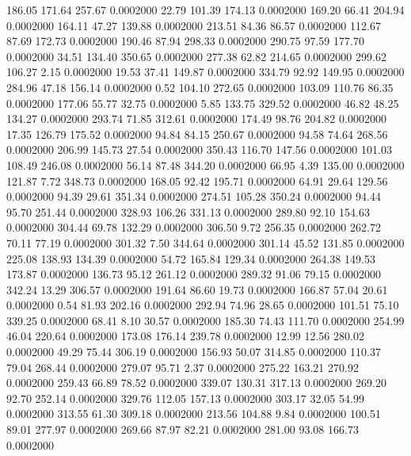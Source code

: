  186.05  171.64  257.67   0.0002000
  22.79  101.39  174.13   0.0002000
 169.20   66.41  204.94   0.0002000
 164.11   47.27  139.88   0.0002000
 213.51   84.36   86.57   0.0002000
 112.67   87.69  172.73   0.0002000
 190.46   87.94  298.33   0.0002000
 290.75   97.59  177.70   0.0002000
  34.51  134.40  350.65   0.0002000
 277.38   62.82  214.65   0.0002000
 299.62  106.27    2.15   0.0002000
  19.53   37.41  149.87   0.0002000
 334.79   92.92  149.95   0.0002000
 284.96   47.18  156.14   0.0002000
   0.52  104.10  272.65   0.0002000
 103.09  110.76   86.35   0.0002000
 177.06   55.77   32.75   0.0002000
   5.85  133.75  329.52   0.0002000
  46.82   48.25  134.27   0.0002000
 293.74   71.85  312.61   0.0002000
 174.49   98.76  204.82   0.0002000
  17.35  126.79  175.52   0.0002000
  94.84   84.15  250.67   0.0002000
  94.58   74.64  268.56   0.0002000
 206.99  145.73   27.54   0.0002000
 350.43  116.70  147.56   0.0002000
 101.03  108.49  246.08   0.0002000
  56.14   87.48  344.20   0.0002000
  66.95    4.39  135.00   0.0002000
 121.87    7.72  348.73   0.0002000
 168.05   92.42  195.71   0.0002000
  64.91   29.64  129.56   0.0002000
  94.39   29.61  351.34   0.0002000
 274.51  105.28  350.24   0.0002000
  94.44   95.70  251.44   0.0002000
 328.93  106.26  331.13   0.0002000
 289.80   92.10  154.63   0.0002000
 304.44   69.78  132.29   0.0002000
 306.50    9.72  256.35   0.0002000
 262.72   70.11   77.19   0.0002000
 301.32    7.50  344.64   0.0002000
 301.14   45.52  131.85   0.0002000
 225.08  138.93  134.39   0.0002000
  54.72  165.84  129.34   0.0002000
 264.38  149.53  173.87   0.0002000
 136.73   95.12  261.12   0.0002000
 289.32   91.06   79.15   0.0002000
 342.24   13.29  306.57   0.0002000
 191.64   86.60   19.73   0.0002000
 166.87   57.04   20.61   0.0002000
   0.54   81.93  202.16   0.0002000
 292.94   74.96   28.65   0.0002000
 101.51   75.10  339.25   0.0002000
  68.41    8.10   30.57   0.0002000
 185.30   74.43  111.70   0.0002000
 254.99   46.04  220.64   0.0002000
 173.08  176.14  239.78   0.0002000
  12.99   12.56  280.02   0.0002000
  49.29   75.44  306.19   0.0002000
 156.93   50.07  314.85   0.0002000
 110.37   79.04  268.44   0.0002000
 279.07   95.71    2.37   0.0002000
 275.22  163.21  270.92   0.0002000
 259.43   66.89   78.52   0.0002000
 339.07  130.31  317.13   0.0002000
 269.20   92.70  252.14   0.0002000
 329.76  112.05  157.13   0.0002000
 303.17   32.05   54.99   0.0002000
 313.55   61.30  309.18   0.0002000
 213.56  104.88    9.84   0.0002000
 100.51   89.01  277.97   0.0002000
 269.66   87.97   82.21   0.0002000
 281.00   93.08  166.73   0.0002000
